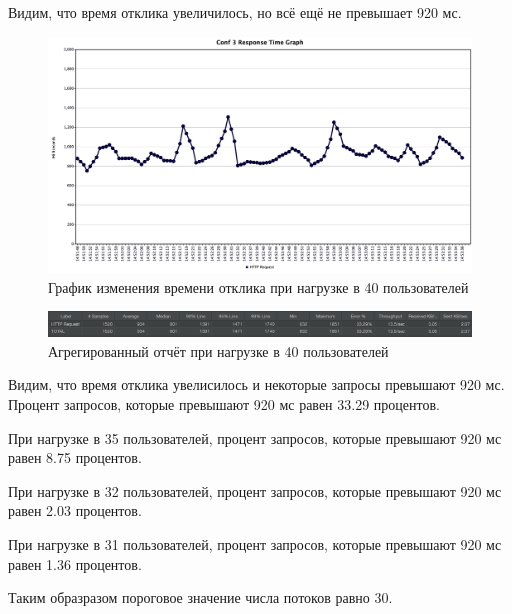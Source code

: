 \documentclass[12pt,onecolumn]{article}
\begin{document}
Видим, что время отклика увеличилось, но всё ещё не превышает 920 мс.

\begin{figure}[H]
  \includegraphics[width=\textwidth]{image/resp-graph-conf-3-4.png}
  \caption{График изменения времени отклика при нагрузке в 40 пользователей}
\end{figure}

\begin{figure}[H]
  \includegraphics[width=\textwidth]{image/aggregate-report-conf3-4.png}
  \caption{Агрегированный отчёт при нагрузке в 40 пользователей}
\end{figure}

Видим, что время отклика увелисилось и некоторые запросы превышают 920 мс.
Процент запросов, которые превышают 920 мс равен 33.29 процентов.

При нагрузке в 35 пользователей, процент запросов, которые превышают 920 мс равен 8.75 процентов.

При нагрузке в 32 пользователей, процент запросов, которые превышают 920 мс равен 2.03 процентов.

При нагрузке в 31 пользователей, процент запросов, которые превышают 920 мс равен 1.36 процентов.

Таким образразом пороговое значение числа потоков равно 30.
\end{document}
